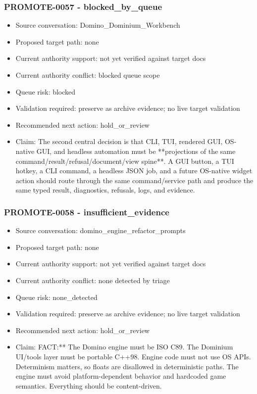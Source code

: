 \documentclass[11pt,a4paper]{report}
\begin{document}
\subsubsection{PROMOTE-0057 - blocked\_by\_queue}

\begin{itemize}
\item Source conversation: Domino\_Dominium\_Workbench
\item Proposed target path: none
\item Current authority support: not yet verified against target docs
\item Current authority conflict: blocked queue scope
\item Queue risk: blocked
\item Validation required: preserve as archive evidence; no live target validation
\item Recommended next action: hold\_or\_review
\item Claim: The second central decision is that CLI, TUI, rendered GUI, OS-native GUI, and headless automation must be **projections of the same command/result/refusal/document/view spine**. A GUI button, a TUI hotkey, a CLI command, a headless JSON job, and a future OS-native widget action should route through the same command/service path and produce the same typed result, diagnostics, refusals, logs, and evidence.
\end{itemize}

\subsubsection{PROMOTE-0058 - insufficient\_evidence}

\begin{itemize}
\item Source conversation: domino\_engine\_refactor\_prompts
\item Proposed target path: none
\item Current authority support: not yet verified against target docs
\item Current authority conflict: none detected by triage
\item Queue risk: none\_detected
\item Validation required: preserve as archive evidence; no live target validation
\item Recommended next action: hold\_or\_review
\item Claim: FACT:** The Domino engine must be ISO C89. The Dominium UI/tools layer must be portable C++98. Engine code must not use OS APIs. Determinism matters, so floats are disallowed in deterministic paths. The engine must avoid platform-dependent behavior and hardcoded game semantics. Everything should be content-driven.
\end{itemize}
\end{document}
